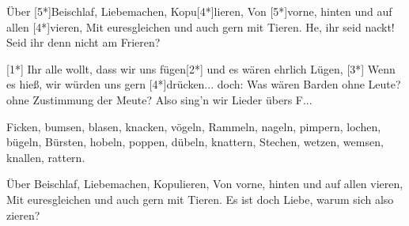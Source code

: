 \begin{guitar}
	Über [5*]Beischlaf, Liebemachen, Kopu[4*]lieren,
	Von [5*]vorne, hinten und auf allen [4*]vieren,
	Mit euresgleichen und auch gern mit Tieren. 
	He, ihr seid nackt! Seid ihr denn nicht am Frieren?
	
	 
	[1*] Ihr alle wollt, dass wir uns fügen[2*] und es wären ehrlich Lügen,
	[3*] Wenn es hieß, wir würden uns gern [4*]drücken... doch:
	Was wären Barden ohne Leute? ohne Zustimmung der Meute?
	Also sing'n wir Lieder übers F...
	
	\begin{highlightbar}
		Ficken, bumsen, blasen, knacken, vögeln,
		Rammeln, nageln, pimpern, lochen, bügeln,
		Bürsten, hobeln, poppen, dübeln, knattern,
		Stechen, wetzen, wemsen, knallen, rattern.
	\end{highlightbar}
	
	Über Beischlaf, Liebemachen, Kopulieren,
	Von vorne, hinten und auf allen vieren,
	Mit euresgleichen und auch gern mit Tieren. 
	Es ist doch Liebe, warum sich also zieren?
\end{guitar}




